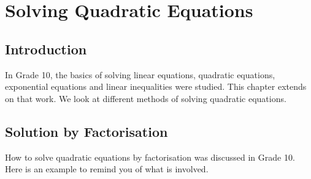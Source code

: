 \chapter{Solving Quadratic Equations}
\label{m:se:q11}


\section{Introduction}
In Grade 10, the basics of solving linear equations, quadratic equations, exponential equations and linear inequalities were studied. This chapter extends on that work. We look at different methods of solving quadratic equations.


\section{Solution by Factorisation}

How to solve quadratic equations by factorisation was discussed in Grade 10. Here is an example to remind you of what is involved.

